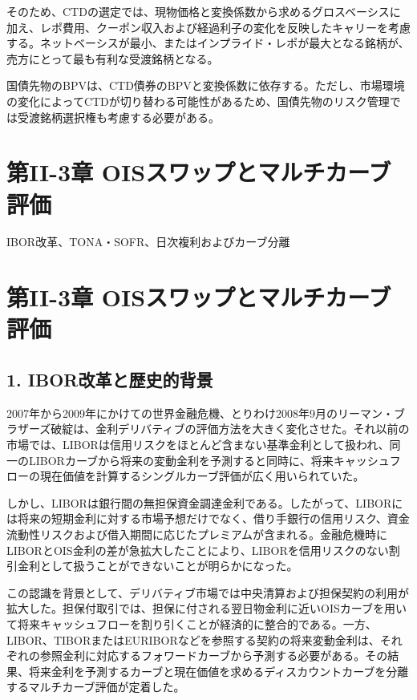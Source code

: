 \documentclass[
  letterpaper,
  DIV=11,
  numbers=noendperiod]{scrreprt}
\begin{document}
そのため、CTDの選定では、現物価格と変換係数から求めるグロスベーシスに加え、レポ費用、クーポン収入および経過利子の変化を反映したキャリーを考慮する。ネットベーシスが最小、またはインプライド・レポが最大となる銘柄が、売方にとって最も有利な受渡銘柄となる。

国債先物のBPVは、CTD債券のBPVと変換係数に依存する。ただし、市場環境の変化によってCTDが切り替わる可能性があるため、国債先物のリスク管理では受渡銘柄選択権も考慮する必要がある。

\chapter{第II-3章
OISスワップとマルチカーブ評価}\label{ux7b2cii-3ux7ae0-oisux30b9ux30efux30c3ux30d7ux3068ux30deux30ebux30c1ux30abux30fcux30d6ux8a55ux4fa1}

IBOR改革、TONA・SOFR、日次複利およびカーブ分離

\hfill\break

\chapter{第II-3章
OISスワップとマルチカーブ評価}\label{ux7b2cii-3ux7ae0-oisux30b9ux30efux30c3ux30d7ux3068ux30deux30ebux30c1ux30abux30fcux30d6ux8a55ux4fa1-1}

\section{1.
IBOR改革と歴史的背景}\label{iborux6539ux9769ux3068ux6b74ux53f2ux7684ux80ccux666f}

2007年から2009年にかけての世界金融危機、とりわけ2008年9月のリーマン・ブラザーズ破綻は、金利デリバティブの評価方法を大きく変化させた。それ以前の市場では、LIBORは信用リスクをほとんど含まない基準金利として扱われ、同一のLIBORカーブから将来の変動金利を予測すると同時に、将来キャッシュフローの現在価値を計算するシングルカーブ評価が広く用いられていた。

しかし、LIBORは銀行間の無担保資金調達金利である。したがって、LIBORには将来の短期金利に対する市場予想だけでなく、借り手銀行の信用リスク、資金流動性リスクおよび借入期間に応じたプレミアムが含まれる。金融危機時にLIBORとOIS金利の差が急拡大したことにより、LIBORを信用リスクのない割引金利として扱うことができないことが明らかになった。

この認識を背景として、デリバティブ市場では中央清算および担保契約の利用が拡大した。担保付取引では、担保に付される翌日物金利に近いOISカーブを用いて将来キャッシュフローを割り引くことが経済的に整合的である。一方、LIBOR、TIBORまたはEURIBORなどを参照する契約の将来変動金利は、それぞれの参照金利に対応するフォワードカーブから予測する必要がある。その結果、将来金利を予測するカーブと現在価値を求めるディスカウントカーブを分離するマルチカーブ評価が定着した。
\end{document}
